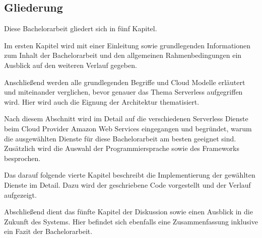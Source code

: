 \subsection{Gliederung}

Diese Bachelorarbeit gliedert sich in fünf Kapitel.

Im ersten Kapitel wird mit einer Einleitung sowie grundlegenden Informationen zum Inhalt der Bachelorarbeit und den allgemeinen Rahmenbedingungen ein Ausblick auf den weiteren Verlauf gegeben.

Anschließend werden alle grundlegenden Begriffe und Cloud Modelle erläutert und miteinander verglichen, bevor genauer das Thema Serverless aufgegriffen wird.
Hier wird auch die Eignung der Architektur thematisiert.

Nach diesem Abschnitt wird im Detail auf die verschiedenen Serverless Dienste beim Cloud Provider Amazon Web Services eingegangen und begründet, warum die ausgewählten Dienste für diese Bachelorarbeit am besten geeignet sind.
Zusätzlich wird die Auswahl der Programmiersprache sowie des Frameworks besprochen.

Das darauf folgende vierte Kapitel beschreibt die Implementierung der gewählten Dienste im Detail. Dazu wird der geschriebene Code vorgestellt und der Verlauf aufgezeigt.

Abschließend dient das fünfte Kapitel der Diskussion sowie einen Ausblick in die Zukunft des Systems.
Hier befindet sich ebenfalls eine Zusammenfassung inklusive ein Fazit der Bachelorarbeit.


